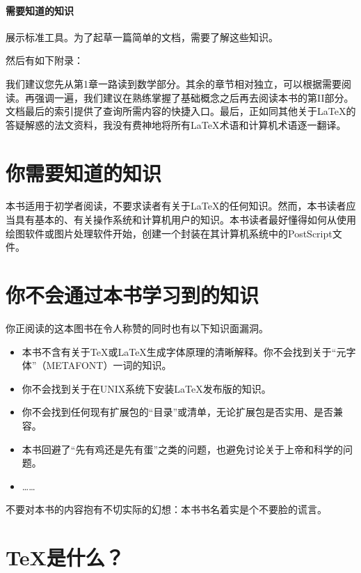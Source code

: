 \paragraph*{需要知道的知识}展示标准工具。为了起草一篇简单的文档，需要了解这些知识。


然后有如下附录：


我们建议您先从第1章一路读到数学部分。其余的章节相对独立，可以根据需要阅读。再强调一遍，我们建议在熟练掌握了基础概念之后再去阅读本书的第II部分。文档最后的索引提供了查询所需内容的快捷入口。最后，正如同其他关于\LaTeX 的答疑解惑的法文资料，我没有费神地将所有\LaTeX 术语和计算机术语逐一翻译。

\section*{你需要知道的知识}

本书适用于初学者阅读，不要求读者有关于\LaTeX 的任何知识。然而，本书读者应当具有基本的、有关操作系统和计算机用户的知识。本书读者最好懂得如何从使用绘图软件或图片处理软件开始，创建一个封装在其计算机系统中的PostScript文件。

\section*{你不会通过本书学习到的知识}

你正阅读的这本图书在令人称赞的同时也有以下知识面漏洞。

\begin{itemize}
    \item 本书不含有关于\TeX 或\LaTeX 生成字体原理的清晰解释。你不会找到关于“元字体”（METAFONT）一词的知识。
    \item 你不会找到关于在UNIX系统下安装\LaTeX 发布版的知识。
    \item 你不会找到任何现有扩展包的“目录”或清单，无论扩展包是否实用、是否兼容。
    \item 本书回避了“先有鸡还是先有蛋”之类的问题，也避免讨论关于上帝和科学的问题。
    \item ……
\end{itemize}

\begin{exclamation}
不要对本书的内容抱有不切实际的幻想：本书书名着实是个不要脸的谎言。
\end{exclamation}

\section*{\TeX 是什么？}

